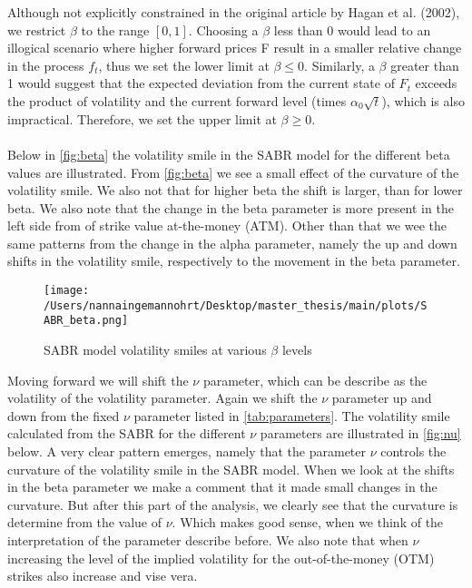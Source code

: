 Although not explicitly constrained in the original article by Hagan et al. (2002), we restrict $\beta$ to the range $[0, 1]$. 
Choosing a $\beta$ less than 0 would lead to an illogical scenario where higher forward prices F result in a smaller 
relative change in the process $f_t$, thus we set the lower limit at $\beta \leq 0$. Similarly, a $\beta$ greater than 1 would 
suggest that the expected deviation from the current state of $F_t$ exceeds the product of volatility and the current 
forward level (times $\alpha_0 \sqrt{t}$), which is also impractical. Therefore, we set the upper limit at $\beta \geq 0$.
\\\\
Below in \autoref{fig:beta} the volatility smile in the SABR model for the different beta values are illustrated.
From \autoref{fig:beta} we see a small effect of the curvature of the volatility smile. We also not that for higher 
beta the shift is larger, than for lower beta. We also note that the change in the beta parameter is more present in 
the left side from of strike value at-the-money (ATM). Other than that we wee the same patterns from the change in 
the alpha parameter, namely the up and down shifts in the volatility smile, respectively to the movement in the 
beta parameter.
\begin{figure}[H]
    \centering
    \texttt{[image: /Users/nannaingemannohrt/Desktop/master\_thesis/main/plots/SABR\_beta.png]}
    \caption{SABR model volatility smiles at various $\beta$ levels}
    \label{fig:beta}
\end{figure}
\noindent
Moving forward we will shift the $\nu$ parameter, which can be describe as the volatility of the volatility parameter.
Again we shift the $\nu$ parameter up and down from the fixed $\nu$ parameter listed in \autoref{tab:parameters}.
The volatility smile calculated from the SABR for the different $\nu$ parameters are illustrated in \autoref{fig:nu} below.
A very clear pattern emerges, namely that the parameter $\nu$ controls the curvature of the volatility smile in
the SABR model. When we look at the shifts in the beta parameter we make a comment that it made small changes in 
the curvature. But after this part of the analysis, we clearly see that the curvature is determine from the value
of $\nu$. Which makes good sense, when we think of the interpretation of the parameter describe before.
We also note that when $\nu$  increasing the level of the implied volatility for the 
out-of-the-money (OTM) strikes also increase and vise vera.
\\\\
